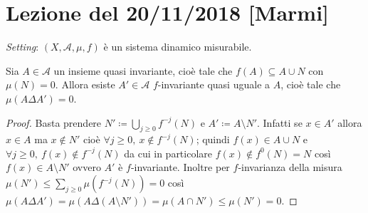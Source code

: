 \section{Lezione del 20/11/2018 [Marmi]}

\emph{Setting}: $ (X, \mathcal{A}, \mu, f) $ è un sistema dinamico misurabile.

\begin{lemma} \label{lem:insieme-quasi-invariante}
    Sia $ A \in \mathcal{A} $ un insieme quasi invariante, cioè tale che $ f(A) \subseteq A \cup N $ con $ \mu(N) = 0 $. Allora esiste $ A' \in \mathcal{A} $ $ f $-invariante quasi uguale a $ A $, cioè tale che $ \mu(A \Delta A') = 0 $.
\end{lemma}
\begin{proof}
    Basta prendere $ N' \coloneqq \bigcup_{j \geq 0} f^{-j}(N) $ e $ A' \coloneqq A \setminus N' $. Infatti se $ x \in A' $ allora $ x \in A $ ma $ x \notin N' $ cioè $ \forall j \geq 0, \ x \notin f^{-j}(N) $; quindi $ f(x) \in A \cup N $ e $ \forall j \geq 0, \ f(x) \notin f^{-j}(N) $ da cui in particolare $ f(x) \notin f^0(N) = N $ così $ f(x) \in A \setminus N' $ ovvero $ A' $ è $ f $-invariante. Inoltre per $ f $-invarianza della misura $ \mu(N') \leq \sum_{j \geq 0} \mu(f^{-j}(N)) = 0 $ così $ \mu(A\Delta A') = \mu(A\Delta(A\setminus N')) = \mu(A \cap N') \leq \mu(N') = 0 $.
\end{proof}

